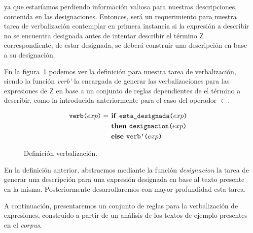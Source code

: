 \noindent
ya que estaríamos perdiendo información valiosa para nuestras descripciones, contenida en las designaciones. Entonces, será un requerimiento para nuestra tarea de verbalización contemplar en primera instancia si la expresión a describir no se encuentra designada antes de intentar describir el término Z correspondiente; de estar designada, se deberá construir una descripción en base a su designación. 

En la figura~\ref{fig:def-verb} podemos ver la definición para nuestra tarea de verbalización, siendo la función \emph{verb'} la encargada de generar las verbalizaciones para las expresiones de Z en base a un conjunto de reglas dependientes de el término a describir, como la introducida anteriormente para el caso del operador $\in$.

\begin{figure}[H]
\begin{align*}
\nlgfun{verb($exp$)} = & \text{\textbf{ if }} \nlgfun{esta\_designada($exp$)} \\
 & \text{\textbf{ then }} \nlgfun{designacion($exp$)} \\
 & \text{\textbf{ else }} \nlgfun{verb'($exp$)} \\
\end{align*}
\caption{Definición verbalización.}
\label{fig:def-verb}
\end{figure}

En la definición anterior, abstraemos mediante la función \emph{designacion} la tarea de generar una descripción para una expresión designada en base al texto presente en la misma. Posteriormente desarrollaremos con mayor profundidad esta tarea. %

A continuación, presentaremos un conjunto de reglas para la verbalización de expresiones, construido a partir de un análisis de los textos de ejemplo presentes en el \emph{corpus}.

